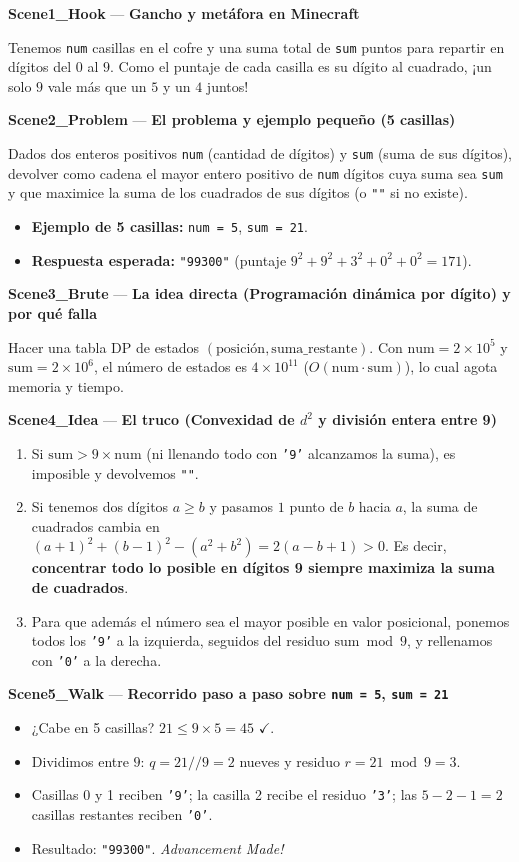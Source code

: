 \documentclass[letterpaper,10pt]{article}
\newcommand{\scene}[2]{\noindent\textbf{\textcolor{mcaqua}{#1}} --- \textbf{#2}\par\vspace{1pt}}
\begin{document}
\begin{shaded}
\scene{Scene1\_Hook}{Gancho y met\'afora en Minecraft}
Tenemos \texttt{num} casillas en el cofre y una suma total de \texttt{sum} puntos para repartir en d\'igitos del $0$ al $9$. Como el puntaje de cada casilla es su d\'igito al cuadrado, ¡un solo $9$ vale m\'as que un $5$ y un $4$ juntos!

\scene{Scene2\_Problem}{El problema y ejemplo peque\~no (5 casillas)}
Dados dos enteros positivos \texttt{num} (cantidad de d\'igitos) y \texttt{sum} (suma de sus d\'igitos), devolver como cadena el mayor entero positivo de \texttt{num} d\'igitos cuya suma sea \texttt{sum} y que maximice la suma de los cuadrados de sus d\'igitos (o \texttt{""} si no existe).
\begin{itemize}\setlength{\itemsep}{1pt}
  \item \textbf{Ejemplo de 5 casillas:} \texttt{num = 5}, \texttt{sum = 21}.
  \item \textbf{Respuesta esperada:} \texttt{"99300"} (puntaje $9^2 + 9^2 + 3^2 + 0^2 + 0^2 = 171$).
\end{itemize}

\scene{Scene3\_Brute}{La idea directa (Programaci\'on din\'amica por d\'igito) y por qu\'e falla}
Hacer una tabla DP de estados $(\text{posici\'on}, \text{suma\_restante})$. Con $\text{num} = 2 \times 10^5$ y $\text{sum} = 2 \times 10^6$, el n\'umero de estados es $4 \times 10^{11}$ ($O(\text{num} \cdot \text{sum})$), lo cual agota memoria y tiempo.

\scene{Scene4\_Idea}{El truco (Convexidad de $d^2$ y divisi\'on entera entre 9)}
\begin{enumerate}\setlength{\itemsep}{1pt}
  \item Si $\text{sum} > 9 \times \text{num}$ (ni llenando todo con \texttt{'9'} alcanzamos la suma), es imposible y devolvemos \texttt{""}.
  \item Si tenemos dos d\'igitos $a \ge b$ y pasamos $1$ punto de $b$ hacia $a$, la suma de cuadrados cambia en $(a+1)^2 + (b-1)^2 - (a^2 + b^2) = 2(a - b + 1) > 0$. Es decir, \textbf{concentrar todo lo posible en d\'igitos 9 siempre maximiza la suma de cuadrados}.
  \item Para que adem\'as el n\'umero sea el mayor posible en valor posicional, ponemos todos los \texttt{'9'} a la izquierda, seguidos del residuo $\text{sum} \bmod 9$, y rellenamos con \texttt{'0'} a la derecha.
\end{enumerate}

\scene{Scene5\_Walk}{Recorrido paso a paso sobre \texttt{num = 5}, \texttt{sum = 21}}
\begin{itemize}\setlength{\itemsep}{1pt}
  \item ¿Cabe en 5 casillas? $21 \le 9 \times 5 = 45$ $\checkmark$.
  \item Dividimos entre $9$: $q = 21 // 9 = 2$ nueves y residuo $r = 21 \bmod 9 = 3$.
  \item Casillas 0 y 1 reciben \texttt{'9'}; la casilla 2 recibe el residuo \texttt{'3'}; las $5 - 2 - 1 = 2$ casillas restantes reciben \texttt{'0'}.
  \item Resultado: \texttt{"99300"}. \textit{Advancement Made!}
\end{itemize}


\end{shaded}
\end{document}
